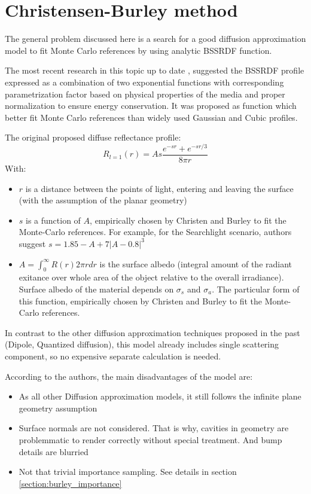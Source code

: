 \section{Christensen-Burley method}
The general problem discussed here is a search for a good diffusion
approximation model to fit Monte Carlo references by using analytic BSSRDF function.

The most recent research in this topic up to date
\cite{Christensen:2015:ARP:2775280.2792555}, \cite{Burley:disney_siggraph15}
suggested the \gls{BSSRDF} profile expressed as a combination of two exponential
functions with corresponding parametrization factor based on physical properties
of the media and proper normalization to ensure energy conservation. It was
proposed as function which better fit Monte Carlo references than widely used
Gaussian and Cubic profiles.

The original proposed diffuse reflectance profile:
\begin{equation}\label{eq:burley}
R_{l=1}(r) = As\dfrac{e^{-sr}+e^{-sr/3}}{8\pi r}
\end{equation}
With:
\begin{itemize}
    \item{$r$ is a distance between the points of light, entering and leaving
    the surface (with the assumption of the planar geometry)}
    \item{$s$ is a function of $A$, empirically chosen by Christen and Burley
    to fit the Monte-Carlo references. For example, for the Searchlight
    scenario, authors suggest $s = 1.85 - A + 7|A-0.8|^3$}
    \item{ $A=\int_0^{\infty} R(r)2\pi rdr$ is the surface albedo (integral
    amount of the radiant exitance over whole area of the object relative to the
    overall irradiance). Surface albedo of the material depends on $\sigma_s$
    and $\sigma_a$. The particular form of this function, empirically chosen by
    Christen and Burley to fit the Monte-Carlo references.}
\end{itemize}

In contrast to the other diffusion approximation techniques proposed in the past
(Dipole, Quantized diffusion), this model already includes single scattering
component, so no expensive separate calculation is needed.


According to the authors, the main disadvantages of the model are:
\begin{itemize}
  \item {As all other Diffusion approximation models, it still follows the
  infinite plane geometry assumption
  }
  \item {Surface normals are not considered. That is why, cavities in
  geometry are problemmatic to render correctly without special treatment. And
  bump details are blurried}
  \item{Not that trivial importance sampling. See details in section
  \ref{section:burley_importance}}
\end{itemize}